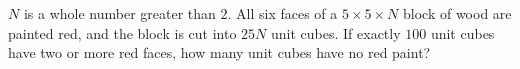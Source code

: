 $N$ is a whole number greater than $2$. All six faces of a $5\times5\times N$ block of wood are painted red, and the block is cut into $25N$ unit cubes. If exactly $100$ unit cubes have two or more red faces, how many unit cubes have no red paint?
